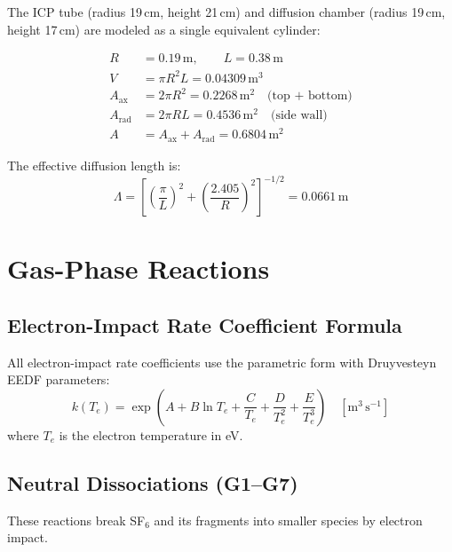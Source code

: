 \documentclass[11pt,a4paper]{article}
\begin{document}
The ICP tube (radius 19\,cm, height 21\,cm) and diffusion chamber (radius 19\,cm, height 17\,cm) are modeled as a single equivalent cylinder:

\begin{align}
  R &= 0.19\,\text{m}, \qquad L = 0.38\,\text{m} \\
  V &= \pi R^2 L = 0.04309\,\text{m}^3 \\
  A_\text{ax} &= 2\pi R^2 = 0.2268\,\text{m}^2 \quad\text{(top + bottom)} \\
  A_\text{rad} &= 2\pi R L = 0.4536\,\text{m}^2 \quad\text{(side wall)} \\
  A &= A_\text{ax} + A_\text{rad} = 0.6804\,\text{m}^2
\end{align}

The effective diffusion length is:
\begin{equation}
  \Lambda = \left[\left(\frac{\pi}{L}\right)^2 + \left(\frac{2.405}{R}\right)^2\right]^{-1/2} = 0.0661\,\text{m}
\end{equation}

\section{Gas-Phase Reactions}

\subsection{Electron-Impact Rate Coefficient Formula}

All electron-impact rate coefficients use the parametric form with Druyvesteyn EEDF parameters:
\begin{equation}\label{eq:krate}
  \boxed{k(T_e) = \exp\!\left(A + B\ln T_e + \frac{C}{T_e} + \frac{D}{T_e^2} + \frac{E}{T_e^3}\right) \quad [\text{m}^3\,\text{s}^{-1}]}
\end{equation}
where $T_e$ is the electron temperature in eV.

\subsection{Neutral Dissociations (G1--G7)}

These reactions break SF$_6$ and its fragments into smaller species by electron impact.
\end{document}
